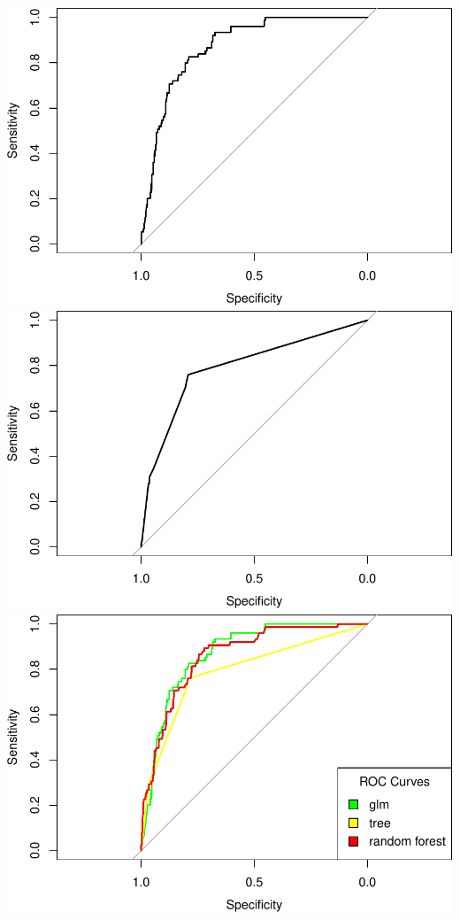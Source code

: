 \documentclass[
  english,
  man]{apa6}
\begin{document}
\includegraphics{report_files/figure-latex/unnamed-chunk-9-1.pdf} \includegraphics{report_files/figure-latex/unnamed-chunk-9-2.pdf} \includegraphics{report_files/figure-latex/unnamed-chunk-9-3.pdf}
\end{document}

